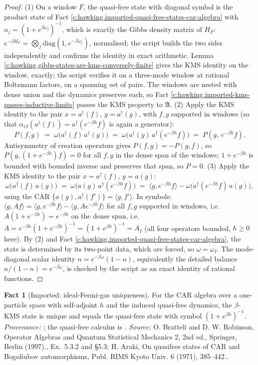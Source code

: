 \documentclass[11pt]{article}
\theoremstyle{definition}
\newtheorem{fact}[theorem]{Fact}
\theoremstyle{plain}
\providecommand{\ip}{}\renewcommand{\ip}[2]{\langle #1, #2\rangle}
\begin{document}
\begin{proof}
(1) On a window $F$, the quasi-free state with diagonal symbol is the product state of Fact \ref{c:hawking.imported-quasi-free-states-car-algebra} with $n_j = (1 + e^{\beta\omega_j})^{-1}$, which is exactly the Gibbs density matrix of $H_F$: $e^{-\beta H_F} = \bigotimes_j \mathrm{diag}(1, e^{-\beta\omega_j})$, normalised; the script builds the two sides independently and confirms the identity in exact arithmetic. Lemma \ref{c:hawking.gibbs-states-are-kms-conversely-finite} gives the KMS identity on the window, exactly; the script verifies it on a three-mode window at rational Boltzmann factors, on a spanning set of pairs. The windows are nested with dense union and the dynamics preserves each, so Fact \ref{c:hawking.imported-kms-passes-inductive-limits} passes the KMS property to $\mathfrak{A}$.
(2) Apply the KMS identity to the pair $x = a^\dagger(f)$, $y = a^\dagger(g)$, with $f, g$ supported in windows (so that $\alpha_{i\beta}(a^\dagger(f)) = a^\dagger(e^{-\beta h}f)$ is again a generator):
\[
P(f, g) \;=\; \omega\bigl(a^\dagger(f)\,a^\dagger(g)\bigr) \;=\; \omega\bigl(a^\dagger(g)\,a^\dagger(e^{-\beta h}f)\bigr) \;=\; P(g,\, e^{-\beta h}f).
\]
Antisymmetry of creation operators gives $P(f, g) = -P(g, f)$, so $P(g, (1 + e^{-\beta h})f) = 0$ for all $f, g$ in the dense span of the windows; $1 + e^{-\beta h}$ is bounded with bounded inverse and preserves that span, so $P = 0$.
(3) Apply the KMS identity to the pair $x = a^\dagger(f)$, $y = a(g)$:
\[
\omega\bigl(a^\dagger(f)\,a(g)\bigr) \;=\; \omega\bigl(a(g)\,a^\dagger(e^{-\beta h}f)\bigr)
\;=\; \ip{g}{e^{-\beta h}f} - \omega\bigl(a^\dagger(e^{-\beta h}f)\,a(g)\bigr),
\]
using the CAR $\{a(g), a^\dagger(f')\} = \ip{g}{f'}$. In symbols: $\ip{g}{Af} = \ip{g}{e^{-\beta h}f} - \ip{g}{Ae^{-\beta h}f}$ for all $f, g$ supported in windows, i.e.\ $A(1 + e^{-\beta h}) = e^{-\beta h}$ on the dense span, i.e.\ $A = e^{-\beta h}(1+e^{-\beta h})^{-1} = (1 + e^{\beta h})^{-1} = A_I$ (all four operators bounded, $h \ge 0$ here). By (2) and Fact \ref{c:hawking.imported-quasi-free-states-car-algebra}, the state is determined by its two-point data, which are forced, so $\omega = \omega_I$. The mode-diagonal scalar identity $n = e^{-\beta\omega}(1-n)$, equivalently the detailed balance $n/(1-n) = e^{-\beta\omega}$, is checked by the script as an exact identity of rational functions.

\end{proof}

\begin{fact}[Imported: ideal-Fermi-gas uniqueness]\label{c:hawking.imported-ideal-fermi-gas-uniqueness}
For the CAR algebra over a one-particle space with self-adjoint $h$ and the induced quasi-free dynamics, the $\beta$-KMS state is unique and equals the quasi-free state with symbol $(1 + e^{\beta h})^{-1}$. \emph{Provenance:} \cite[Ex.~5.3.2 and \S 5.3]{BratteliRobinson1997}; the quasi-free calculus is \cite{Araki1971}.
\emph{Source:} O. Bratteli and D. W. Robinson, Operator Algebras and Quantum Statistical Mechanics 2, 2nd ed., Springer, Berlin (1997)., Ex.~5.3.2 and \S 5.3; H. Araki, On quasifree states of CAR and Bogoliubov automorphisms, Publ. RIMS Kyoto Univ. 6 (1971), 385--442..
\end{fact}
\end{document}
